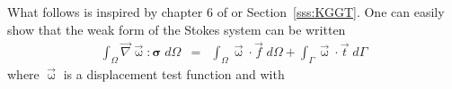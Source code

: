 What follows is inspired by chapter 6 of \textcite{dohu03} or Section~\ref{sss:KGGT}.
One can easily show that the weak form of the Stokes system can be written 
\begin{eqnarray}
\int_\Omega \vec\nabla \vec{\upomega} : {\bm \sigma} \; d\Omega
&=& \int_\Omega \vec\upomega \cdot \vec{f} \; d\Omega + \int_\Gamma \vec\upomega \cdot \vec{t} \; d\Gamma
\label{eq:elwf1} 
\end{eqnarray}
where $\vec\upomega$ is a displacement test function and with 




